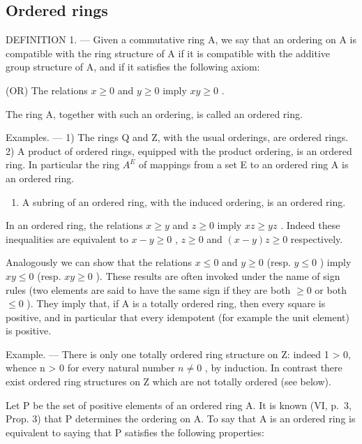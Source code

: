 \subsection{Ordered rings}

DEFINITION 1. --- Given a commutative ring A, we say that an ordering on A is compatible with the ring structure of A if it is compatible with the additive group structure of A, and if it satisfies the following axiom:

(OR) The relations \(x \geqslant 0\) and \(y \geqslant 0\) imply \(xy \geqslant 0\) .

The ring A, together with such an ordering, is called an ordered ring.

Examples. --- 1) The rings Q and Z, with the usual orderings, are ordered rings. 2) A product of ordered rings, equipped with the product ordering, is an ordered ring. In particular the ring \(A^{E}\) of mappings from a set E to an ordered ring A is an ordered ring.

\begin{enumerate}
\def\labelenumi{\arabic{enumi})}
\setcounter{enumi}{2}
\tightlist
\item
  A subring of an ordered ring, with the induced ordering, is an ordered ring.
\end{enumerate}

In an ordered ring, the relations \(x \geqslant y\) and \(z \geqslant 0\) imply \(xz \geqslant yz\) . Indeed these inequalities are equivalent to \(x - y \geqslant 0\) , \(z \geqslant 0\) and \((x - y)z \geqslant 0\) respectively.

Analogously we can show that the relations \(x \leqslant 0\) and \(y \geqslant 0\) (resp. \(y \leqslant 0\) ) imply \(xy \leqslant 0\) (resp. \(xy \geqslant 0\) ). These results are often invoked under the name of sign rules (two elements are said to have the same sign if they are both \(\geqslant 0\) or both \(\leqslant 0\) ). They imply that, if A is a totally ordered ring, then every square is positive, and in particular that every idempotent (for example the unit element) is positive.

Example. --- There is only one totally ordered ring structure on Z: indeed 1 \textgreater{} 0, whence n \textgreater{} 0 for every natural number \(n \neq 0\) , by induction. In contrast there exist ordered ring structures on Z which are not totally ordered (see below).

Let P be the set of positive elements of an ordered ring A. It is known (VI, p.~3, Prop. 3) that P determines the ordering on A. To say that A is an ordered ring is equivalent to saying that P satisfies the following properties:

